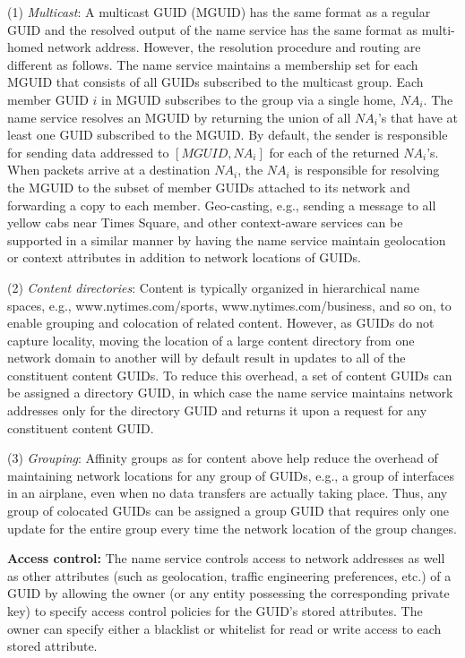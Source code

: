 (1) {\em Multicast}: A multicast GUID (MGUID) has the same format as a regular GUID and the resolved output of the name service has the same format as multi-homed network address. However, the resolution procedure and routing are different as follows. The name service maintains a membership set for each MGUID that consists of all GUIDs subscribed to the multicast group. Each member GUID $i$ in MGUID subscribes to the group via a single home, $NA_i$. The name service resolves an MGUID by returning the union of all $NA_i$'s that have at least one GUID subscribed to the MGUID. By default, the sender is responsible for sending data addressed to $[\textit{MGUID}, NA_i]$ for each of the returned $\textit{NA}_i$'s. When packets arrive at a destination $\textit{NA}_i$, the $\textit{NA}_i$ is responsible for resolving the MGUID to the subset of member GUIDs attached to its network and forwarding a copy to each member. Geo-casting, e.g., sending a message to all yellow cabs near Times Square, and other context-aware services can be supported in a similar manner by having the name service maintain geolocation or context attributes in addition to network locations of GUIDs.

(2) {\em Content directories}: Content is typically organized in hierarchical name spaces, e.g., www.nytimes.com/sports, www.nytimes.com/business, and so on, to enable grouping and colocation of related content. However, as GUIDs do not capture locality, moving the location of a large content directory from one network domain to another will by default result in updates to all of the constituent content GUIDs. To reduce this overhead, a set of content GUIDs can be assigned a directory GUID, in which case the name service maintains network addresses only for the directory GUID and returns it upon a request for any constituent content GUID.

(3) {\em Grouping}: Affinity groups as for content above help reduce the overhead of maintaining network locations for any group of GUIDs, e.g., a group of interfaces in an airplane, even when no data transfers are actually taking place. Thus, any group of colocated GUIDs can be assigned a group GUID that requires only one update for the entire group every time the network location of the group changes.

\textbf{Access control:} The name service controls access to network addresses as well as other attributes (such as geolocation, traffic engineering preferences, etc.) of a GUID by allowing the owner (or any entity possessing the corresponding private key) to specify access control policies for the GUID's stored attributes. The owner can specify either a blacklist or whitelist for read or write access to each stored attribute.
